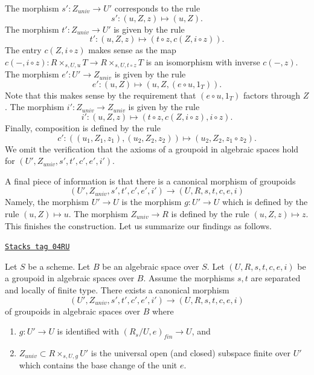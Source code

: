 \medskip\noindent
The morphism $s' : Z_{univ} \to U'$ corresponds to the rule
$$
s' : (u, Z, z) \mapsto (u, Z).
$$
The morphism $t' : Z_{univ} \to U'$ is given by the rule
$$
t' : (u, Z, z) \mapsto (t \circ z, c(Z, i \circ z)).
$$
The entry $c(Z, i \circ z)$
makes sense as the map
$c(-, i \circ z) : R \times_{s, U, u} T \to R \times_{s, U, t \circ z} T$
is an isomorphism with inverse $c(-, z)$.
The morphism $e' : U' \to Z_{univ}$ is given by the rule
$$
e' : (u, Z) \mapsto (u, Z, (e \circ u, 1_T)).
$$
Note that this makes sense by the requirement that $(e \circ u, 1_T)$
factors through $Z$.
The morphism $i' : Z_{univ} \to Z_{univ}$ is given by the rule
$$
i' : (u, Z, z) \mapsto (t \circ z, c(Z, i \circ z), i \circ z).
$$
Finally, composition is defined by the rule
$$
c' : ((u_1, Z_1, z_1), (u_2, Z_2, z_2)) \mapsto (u_2, Z_2, z_1 \circ z_2).
$$
We omit the verification that the axioms of a groupoid in algebraic
spaces hold for $(U', Z_{univ}, s', t', c', e', i')$.

\medskip\noindent
A final piece of information is that there is a canonical morphism
of groupoids
$$
(U', Z_{univ}, s', t', c', e', i')
\longrightarrow
(U, R, s, t, c, e, i)
$$
Namely, the morphism $U' \to U$ is the morphism $g : U' \to U$
which is defined by the rule $(u, Z) \mapsto u$. The morphism
$Z_{univ} \to R$ is defined by the rule $(u, Z, z) \mapsto z$.
This finishes the construction. Let us summarize our findings as
follows.

\begin{lemma}
\label{spaces-more-groupoids-lemma-finite-part-groupoid}
\href{https://stacks.math.columbia.edu/tag/04RU}{\texttt{Stacks tag 04RU}}

Let $S$ be a scheme.
Let $B$ be an algebraic space over $S$.
Let $(U, R, s, t, c, e, i)$ be a groupoid in algebraic spaces over $B$.
Assume the morphisms $s, t$ are separated and locally of finite type.
There exists a canonical morphism
$$
(U', Z_{univ}, s', t', c', e', i')
\longrightarrow
(U, R, s, t, c, e, i)
$$
of groupoids in algebraic spaces over $B$ where
\begin{enumerate}
\item $g : U' \to U$ is identified with $(R_s/U, e)_{fin} \to U$, and
\item $Z_{univ} \subset R \times_{s, U, g} U'$ is the universal
open (and closed) subspace finite over $U'$ which contains the base
change of the unit $e$.
\end{enumerate}
\end{lemma}

